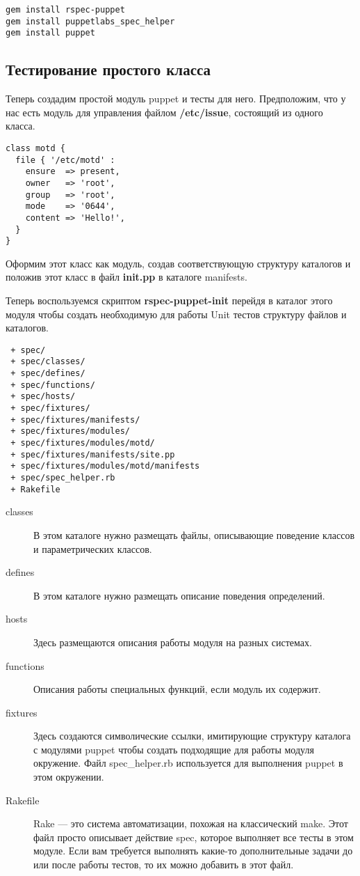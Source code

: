 \begin{verbatim}
gem install rspec-puppet
gem install puppetlabs_spec_helper
gem install puppet
\end{verbatim}

\subsection{Тестирование простого класса}

Теперь создадим простой модуль puppet и тесты для него. Предположим, что у нас есть модуль для управления файлом \textbf{/etc/issue}, состоящий из одного класса.

\begin{lstlisting}
class motd {
  file { '/etc/motd' :
    ensure  => present,
    owner   => 'root',
    group   => 'root',
    mode    => '0644',
    content => 'Hello!',
  }
}
\end{lstlisting}

Оформим этот класс как модуль, создав соответствующую структуру каталогов и положив этот класс в файл \textbf{init.pp} в каталоге manifests.


Теперь воспользуемся скриптом \textbf{rspec-puppet-init} перейдя в каталог этого модуля чтобы создать необходимую для работы Unit тестов структуру файлов и каталогов.

\begin{verbatim}
 + spec/
 + spec/classes/
 + spec/defines/
 + spec/functions/
 + spec/hosts/
 + spec/fixtures/
 + spec/fixtures/manifests/
 + spec/fixtures/modules/
 + spec/fixtures/modules/motd/
 + spec/fixtures/manifests/site.pp
 + spec/fixtures/modules/motd/manifests
 + spec/spec_helper.rb
 + Rakefile
\end{verbatim}

\begin{description}
\item[classes] В этом каталоге нужно размещать файлы, описывающие поведение классов и параметрических классов.
\item[defines] В этом каталоге нужно размещать описание поведения определений.
\item[hosts] Здесь размещаются описания работы модуля на разных системах.
\item[functions] Описания работы специальных функций, если модуль их содержит.
\item[fixtures] Здесь создаются символические ссылки, имитирующие структуру каталога с модулями puppet чтобы создать подходящие для работы модуля окружение. Файл spec\_helper.rb используется для выполнения puppet в этом окружении.
\item[Rakefile] Rake --- это система автоматизации, похожая на классический make. Этот файл просто описывает действие spec, которое выполняет все тесты в этом модуле. Если вам требуется выполнять какие-то дополнительные задачи до или после работы тестов, то их можно добавить в этот файл.
\end{description}

